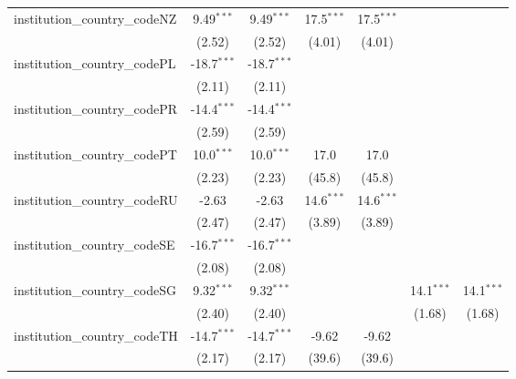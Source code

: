 \begin{tabular}{lcccccc}
   institution\_country\_codeNZ          & 9.49$^{***}$  & 9.49$^{***}$  & 17.5$^{***}$  & 17.5$^{***}$  &               &   \\   
                                         & (2.52)        & (2.52)        & (4.01)        & (4.01)        &               &   \\   
   institution\_country\_codePL          & -18.7$^{***}$ & -18.7$^{***}$ &               &               &               &   \\   
                                         & (2.11)        & (2.11)        &               &               &               &   \\   
   institution\_country\_codePR          & -14.4$^{***}$ & -14.4$^{***}$ &               &               &               &   \\   
                                         & (2.59)        & (2.59)        &               &               &               &   \\   
   institution\_country\_codePT          & 10.0$^{***}$  & 10.0$^{***}$  & 17.0          & 17.0          &               &   \\   
                                         & (2.23)        & (2.23)        & (45.8)        & (45.8)        &               &   \\   
   institution\_country\_codeRU          & -2.63         & -2.63         & 14.6$^{***}$  & 14.6$^{***}$  &               &   \\   
                                         & (2.47)        & (2.47)        & (3.89)        & (3.89)        &               &   \\   
   institution\_country\_codeSE          & -16.7$^{***}$ & -16.7$^{***}$ &               &               &               &   \\   
                                         & (2.08)        & (2.08)        &               &               &               &   \\   
   institution\_country\_codeSG          & 9.32$^{***}$  & 9.32$^{***}$  &               &               & 14.1$^{***}$  & 14.1$^{***}$\\   
                                         & (2.40)        & (2.40)        &               &               & (1.68)        & (1.68)\\   
   institution\_country\_codeTH          & -14.7$^{***}$ & -14.7$^{***}$ & -9.62         & -9.62         &               &   \\   
                                         & (2.17)        & (2.17)        & (39.6)        & (39.6)        &               &   \\   

\end{tabular}
